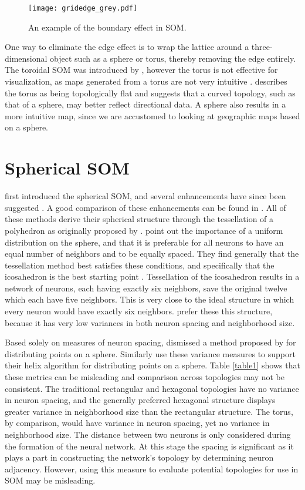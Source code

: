 \begin{figure}[htb]
\centering
\texttt{[image: gridedge\_grey.pdf]}
\caption{An example of the boundary effect in SOM.}
\label{som:states}
\end{figure}

One way to eliminate the edge effect is to wrap the lattice around a
three-dimensional object such as a sphere or torus, thereby removing the edge
entirely. The toroidal SOM was introduced by \cite{li1993}, however the torus
is not effective for visualization, as maps generated from a torus are not
very intuitive \citep{ito2000,wu2006}.  \cite{ritter99} describes the torus as
being topologically flat and suggests that a curved topology, such as that of
a sphere, may better reflect directional data.  A sphere also results in a
more intuitive map, since we are accustomed to looking at geographic maps
based on a sphere.  

\section{Spherical SOM}
\cite{ritter99} first introduced the spherical SOM, and several enhancements have
since been suggested \citep{boudjemai2003,sangole03,Nishio:2006fk,wu2006}.  A
good comparison of these enhancements can be found in \cite{wu2006}.  All of
these methods derive their spherical structure through the tessellation of a
polyhedron as originally proposed by \cite{ritter99}.  \cite{wu2006} point
out the importance of a uniform distribution on the sphere, and that it is
preferable for all neurons to have an equal number of neighbors and to be
equally spaced.  They find generally that the tessellation method best satisfies
these conditions, and specifically that the icosahedron is the best starting
point \citep{wu2005}. Tessellation of the icosahedron results in a network of
neurons, each having exactly six neighbors, save the original twelve
which each have five neighbors.  This is very close to the ideal structure in
which every neuron would have exactly six neighbors.  \cite{wu2006} prefer
these this structure, because it has very low variances in both neuron spacing
and neighborhood size. 

Based solely on measures of neuron spacing, \cite{wu2005} dismissed a method
proposed by \cite{Rakhmanov94} for distributing points on a sphere.  Similarly
\cite{Nishio:2006fk} use these variance measures to support their helix
algorithm for distributing points on a sphere.  Table \ref{table1} shows that
these metrics can be misleading and comparison across topologies may not be
consistent.  The traditional rectangular and hexagonal topologies have no
variance in neuron spacing, and the generally preferred hexagonal structure
displays greater variance in neighborhood size than the rectangular structure.
The torus, by comparison, would have variance in neuron spacing, yet no
variance in neighborhood size.  The distance between two neurons is only
considered during the formation of the neural network.  At this stage the
spacing is significant as it plays a part in constructing the network's
topology by determining neuron adjacency.  However, using this measure to
evaluate potential topologies for use in SOM may be misleading.

